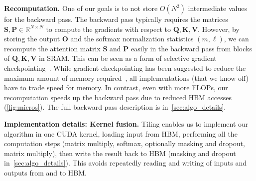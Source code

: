\documentclass{article}
\newcommand{\vQ}{\mathbf{Q}}
\newcommand{\vK}{\mathbf{K}}
\newcommand{\vV}{\mathbf{V}}
\newcommand{\vS}{\mathbf{S}}
\newcommand{\vP}{\mathbf{P}}
\newcommand{\vO}{\mathbf{O}}
\begin{document}
\textbf{Recomputation.}
One of our goals is to not store $O(N^2)$ intermediate values for the backward
pass.
The backward pass typically requires the matrices
$\vS, \vP \in \mathbb{R}^{N \times N}$ to compute the gradients with respect to $\vQ, \vK, \vV$.
However, by storing the output $\vO$ and the softmax normalization statistics $(m, \ell)$, we can
recompute the attention matrix $\vS$ and $\vP$ easily in the backward pass from blocks of $\vQ, \vK, \vV$ in SRAM.
This can be seen as a form of selective gradient checkpointing~\citep{griewank2008evaluating, chen2016training}.
While gradient checkpointing has been suggested to reduce the maximum amount of memory required~\citep{rabe2021self}, all implementations (that we know off) have to trade speed for memory.
In contrast, even with more FLOPs, our recomputation speeds up the backward pass due to reduced HBM accesses (\cref{fig:micros}).
The full backward pass description is in~\cref{sec:algo_details}.

\textbf{Implementation details: Kernel fusion.}
Tiling enables us to implement our algorithm in one CUDA kernel, loading input from HBM,
performing all the computation steps (matrix multiply, softmax, optionally
masking and dropout, matrix multiply), then write the result back to HBM (masking and dropout in~\cref{sec:algo_details}).
This avoids repeatedly reading and writing of inputs and outputs from and to HBM.
\end{document}
